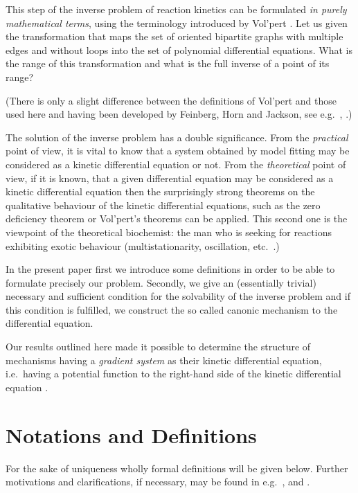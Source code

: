 \documentclass[12pt,a4paper]{article}
\begin{document}
This step of the inverse problem of reaction kinetics can be formulated \emph{in purely mathematical terms}, using the terminology introduced by Vol'pert \cite{Volpert1972}.  Let us given the transformation that maps the set of oriented bipartite graphs with multiple edges and without loops into the set of polynomial differential equations.  What is the range of this transformation and what is the full inverse of a point of its range?

(There is only a slight difference between the definitions of Vol'pert and those used here and having been developed by Feinberg, Horn and Jackson, see e.g.\ \cite{Feinberg1977}, \cite{TothErdi1978}.)

The solution of the inverse problem has a double significance.  From the \emph{practical} point of view, it is vital to know that a system obtained by model fitting may be considered as a kinetic differential equation or not.  From the \emph{theoretical} point of view, if it is known, that a given differential equation may be considered as a kinetic differential equation then the surprisingly strong theorems on the qualitative behaviour of the kinetic differential equations, such as the zero deficiency theorem or Vol'pert's theorems can be applied.  This second one is the viewpoint of the theoretical biochemist: the man who is seeking for reactions exhibiting exotic behaviour (multistationarity, oscillation, etc.\ \cite{ErdiTothHars1979}.)

In the present paper first we introduce some definitions in order to be able to formulate precisely our problem.  Secondly, we give an (essentially trivial) necessary and sufficient condition for the solvability of the inverse problem and if this condition is fulfilled, we construct the so called canonic mechanism to the differential equation.

Our results outlined here made it possible to determine the structure of mechanisms having a \emph{gradient system} as their kinetic differential equation, i.e.\ having a potential function to the right-hand side of the kinetic differential equation \cite{Toth1979gradient}.


\section{Notations and Definitions}

For the sake of uniqueness wholly formal definitions will be given below.  Further motivations and clarifications, if necessary, may be found in e.g.\ \cite{Feinberg1977}, \cite{HornJackson1972} and \cite{TothErdi1978}.
\end{document}

